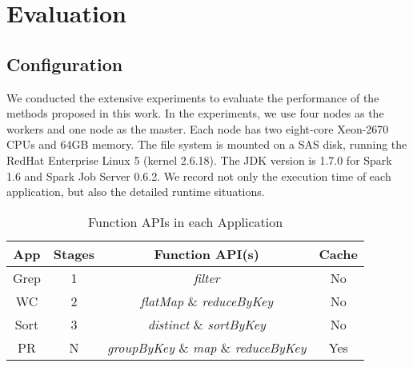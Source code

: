 \section{Evaluation}

\subsection{Configuration}

We conducted the extensive experiments to evaluate the performance of the methods proposed in this work. In the experiments, we use four nodes as the workers and one node as the master. Each node has two eight-core Xeon-2670 CPUs and 64GB memory. The file system is mounted on a SAS disk, running the RedHat Enterprise Linux 5 (kernel 2.6.18). The JDK version is 1.7.0 for Spark 1.6 and Spark Job Server 0.6.2. We record not only the execution time of each application, but also the detailed runtime situations.

\begin{table}[!t]
\small
\centering
\caption{Function APIs in each Application}
\vspace{-2mm}
\begin{tabular}{ c | c | c | c }

\hline
\textbf{App} & \textbf{Stages} & \textbf{Function API(s)} & \textbf{Cache} \\
\hline
Grep & 1 & \textit{filter} & No \\
\hline
WC & 2 & \textit{flatMap} \& \textit{reduceByKey} & No \\
\hline
Sort & 3 & \textit{distinct} \& \textit{sortByKey} & No \\
\hline
PR & N & \textit{groupByKey} \& \textit{map} \& \textit{reduceByKey} & Yes \\
\hline

\hline
\end{tabular}
\vspace{-4mm}
\label{table:app}
\end{table} 

